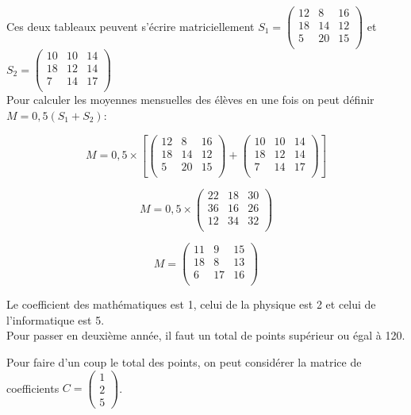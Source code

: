 \documentclass[a4paper,12pt]{book}
\begin{document}
Ces deux tableaux peuvent s'écrire matriciellement 
$S_1= \begin{pmatrix}
12 & 8 & 16 \\
18 & 14 & 12 \\
5 & 20 & 15 \\
\end{pmatrix}$
et $S_2= \begin{pmatrix}
10 & 10 & 14 \\
18 & 12 & 14 \\
7 & 14 & 17 \\
\end{pmatrix}$\\

Pour calculer les moyennes mensuelles des élèves \og en une fois\fg{} on peut définir $M=0,5(S_1+S_2)$: 

$$M = 0,5 \times \left[\begin{pmatrix}
12 & 8 & 16 \\
18 & 14 & 12 \\
5 & 20 & 15 \\
\end{pmatrix}+\begin{pmatrix}
10 & 10 & 14 \\
18 & 12 & 14 \\
7 & 14 & 17 \\
\end{pmatrix}\right]$$

$$M = 0,5\times \begin{pmatrix}
22 & 18 & 30 \\
36 & 16 & 26 \\
12 & 34 & 32 \\
\end{pmatrix}$$

$$M = \begin{pmatrix}
11 & 9 & 15 \\
18 & 8 & 13 \\
6 & 17 & 16 \\
\end{pmatrix}$$

Le coefficient des mathématiques est 1, celui de la physique est 2 et celui de l'informatique est 5.\\
Pour passer en deuxième année, il faut un total de points supérieur ou égal à 120.

Pour faire \og d'un coup\fg{} le total des points, on peut considérer la matrice de coefficients $C=\begin{pmatrix}
1\\2\\5
\end{pmatrix}$.\\
\end{document}
